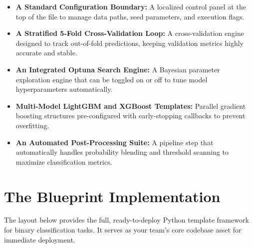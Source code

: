 \documentclass{article}
\begin{document}
\begin{itemize}
    \item \textbf{A Standard Configuration Boundary:} A localized control panel at the top of the file to manage data paths, seed parameters, and execution flags.
    \item \textbf{A Stratified 5-Fold Cross-Validation Loop:} A cross-validation engine designed to track out-of-fold predictions, keeping validation metrics highly accurate and stable.
    \item \textbf{An Integrated Optuna Search Engine:} A Bayesian parameter exploration engine that can be toggled on or off to tune model hyperparameters automatically.
    \item \textbf{Multi-Model LightGBM and XGBoost Templates:} Parallel gradient boosting structures pre-configured with early-stopping callbacks to prevent overfitting.
    \item \textbf{An Automated Post-Processing Suite:} A pipeline step that automatically handles probability blending and threshold scanning to maximize classification metrics.
\end{itemize}

\section{The Blueprint Implementation}
The layout below provides the full, ready-to-deploy Python template framework for binary classification tasks. It serves as your team's core codebase asset for immediate deployment.
\end{document}
